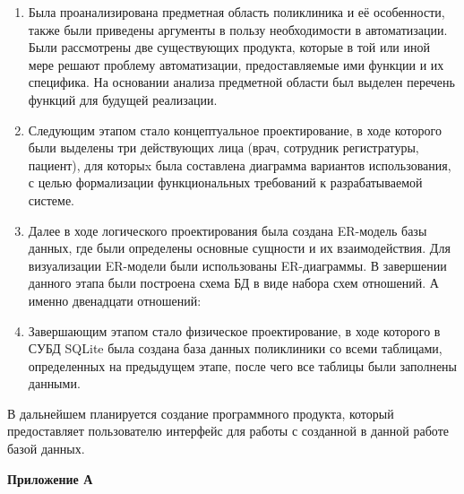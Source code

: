 \documentclass[14pt,a4paper,russian]{extreport}
\begin{document}
\begin{enumerate}[noitemsep]
        \vspace{-5pt}
    \item Была проанализирована предметная область поликлиника и её особенности, также были
        приведены аргументы в пользу необходимости в автоматизации. Были рассмотрены две существующих
        продукта, которые в той или иной мере решают проблему автоматизации, предоставляемые ими
        функции и их специфика. На основании анализа предметной области был выделен перечень
        функций для будущей реализации.
    \item Следующим этапом стало концептуальное проектирование, в ходе которого были выделены
        три 
        действующих лица (врач, сотрудник регистратуры, пациент), для которыx была составлена
        диаграмма вариантов использования, с целью формализации функциональных требований к разрабатываемой системе.
    \item Далее в ходе логического проектирования была создана ER-модель базы данных, где были
        определены основные сущности и их взаимодействия. Для визуализации ER-модели были
        использованы ER-диаграммы. В завершении данного этапа были построена схема БД в виде набора
        схем отношений. А именно двенадцати отношений: 
    \item Завершающим этапом стало физическое проектирование, в ходе которого в СУБД SQLite была
        создана база данных поликлиники со всеми таблицами, определенных на предыдущем этапе, после
        чего все таблицы были заполнены данными.
\end{enumerate}


    В дальнейшем планируется создание программного продукта, который предоставляет
        пользователю интерфейс для работы с созданной в данной работе базой данных.

{}

\newpage
\hfill\textbf{Приложение А}
\setcounter{lstlisting}{0}
\end{document}
